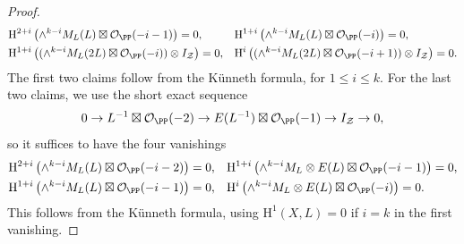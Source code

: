 \begin{proof}
{{\begin{align*}
&\mathrm{H}^{2+i}\left( \wedge^{k-i} M_L (L) \boxtimes   \mathcal{O}_{\PP}(-i-1)  \right)=0, & &\mathrm{H}^{1+i}\left(\wedge^{k-i} M_L (L) \boxtimes \mathcal{O}_{\PP}(-i)  \right)=0,\\
&\mathrm{H}^{1+i}\left((\wedge^{k-i} M_L (2L) \boxtimes \mathcal{O}_{\PP}(-i) )\otimes I_{\mathcal{Z}} \right)=0, & &\mathrm{H}^{i}\left((\wedge^{k-i} M_L (2L) \boxtimes \mathcal{O}_{\PP}(-i+1) )\otimes I_{\mathcal{Z}} \right)=0.
\end{align*}}}
The first two claims follow from the K\"unneth formula, for $1 \leq i \leq k$. For the last two claims, we use the short exact sequence
$$0 \to L^{-1} \boxtimes \mathcal{O}_{\PP}(-2) \to E(L^{-1}) \boxtimes \mathcal{O}_{\PP}(-1) \to I_{\mathcal{Z}} \to 0,$$
so it suffices to have the four vanishings
{\small{\begin{align*}
&\mathrm{H}^{2+i}\left(\wedge^{k-i} M_L (L) \boxtimes \mathcal{O}_{\PP}(-i-2)  \right)=0,
& &\mathrm{H}^{1+i}\left( \wedge^{k-i} M_L \otimes E(L) \boxtimes \mathcal{O}_{\PP}(-i-1)  \right)=0,\\
&\mathrm{H}^{1+i}\left( \wedge^{k-i} M_L (L) \boxtimes \mathcal{O}_{\PP}(-i-1)  \right)=0,
& &\mathrm{H}^{i}\left(\wedge^{k-i} M_L \otimes E(L) \boxtimes \mathcal{O}_{\PP}(-i)  \right)=0.
\end{align*}}}
This follows from the K\"unneth formula, using $\mathrm{H}^1(X,L)=0$ if $i=k$ in the first vanishing.
\end{proof}

